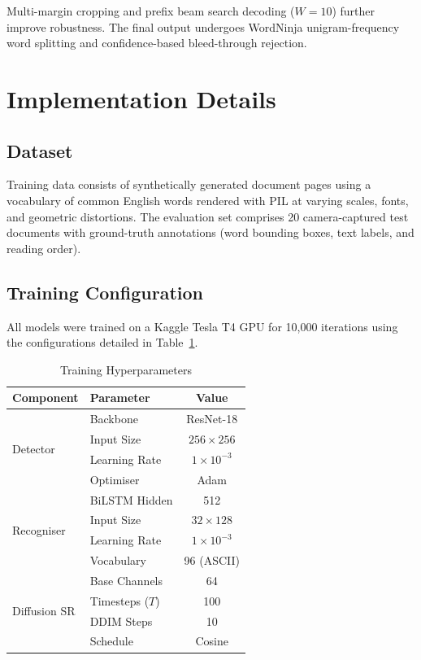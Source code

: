 \documentclass[conference]{IEEEtran}
\begin{document}
Multi-margin cropping and prefix beam search decoding ($W = 10$) further improve robustness. The final output undergoes WordNinja unigram-frequency word splitting and confidence-based bleed-through rejection.

\section{Implementation Details}

\subsection{Dataset}
Training data consists of synthetically generated document pages using a vocabulary of common English words rendered with PIL at varying scales, fonts, and geometric distortions. The evaluation set comprises 20 camera-captured test documents with ground-truth annotations (word bounding boxes, text labels, and reading order).

\subsection{Training Configuration}
All models were trained on a Kaggle Tesla T4 GPU for 10,000 iterations using the configurations detailed in Table~\ref{tab:hyperparams}.

\begin{table}[t]
    \centering
    \caption{Training Hyperparameters}
    \label{tab:hyperparams}
    \begin{tabular}{llc}
        \toprule
        \textbf{Component} & \textbf{Parameter} & \textbf{Value} \\
        \midrule
        \multirow{4}{*}{Detector} & Backbone & ResNet-18 \\
        & Input Size & $256 \times 256$ \\
        & Learning Rate & $1 \times 10^{-3}$ \\
        & Optimiser & Adam \\
        \midrule
        \multirow{4}{*}{Recogniser} & BiLSTM Hidden & 512 \\
        & Input Size & $32 \times 128$ \\
        & Learning Rate & $1 \times 10^{-3}$ \\
        & Vocabulary & 96 (ASCII) \\
        \midrule
        \multirow{4}{*}{Diffusion SR} & Base Channels & 64 \\
        & Timesteps ($T$) & 100 \\
        & DDIM Steps & 10 \\
        & Schedule & Cosine \\
        \bottomrule
    \end{tabular}
\end{table}
\end{document}
